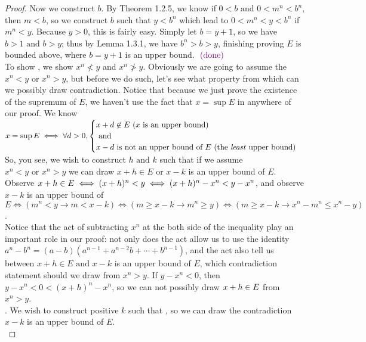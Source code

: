 \documentclass{report}
\begin{document}
\begin{proof}
Now we construct $b$. By Theorem 1.2.5, we know if $0<b\text{ and }0<m^n<b^n$, then $m<b$, so we construct $b$ such that $y<b^n$ which lead to $0<m^n<y<b^n$ if  $m^n<y$. Because $y>0$, this is fairly easy. Simply let $b=y+1$, so we have $b>1\text{ and }b>y$; thus by Lemma 1.3.1, we have $b^n>b>y$, finishing proving $E$ is bounded above, where  $b=y+1$ is an upper bound. $\textcolor{violet}{\text{ (done) }}$ \\

To show , we show $x^n\not<y$ and $x^n\not>y$. Obviously we are going to assume the $x^n<y$ or $x^n>y$, but before we do such, let's see what property from which can we possibly draw contradiction. Notice that because we just prove the existence of the supremum of $E$, we haven't use the fact that $x=\sup E$ in anywhere of our proof. We know $x=\sup E\iff \forall d>0,\begin{cases}
x+d\not\in E\text{ ($x$ is an upper bound) }\\
\text{ and }\\
x-d \text{ is not an upper bound of $E$ (the \emph{least} upper bound)}
\end{cases}$    
So, you see, we wish to construct $h\text{ and }k$ such that if we assume $x^n<y\text{ or }x^n>y$ we can draw $x+h\in E$ or $x-k$ is an upper bound of $E$.\\

Observe $x+h\in E\iff (x+h)^n<y\iff (x+h)^n-x^n<y-x^n$, and observe $x-k$ is an upper bound of $E\iff (m^n<y\longrightarrow m<x-k)\iff (m\geq x-k\longrightarrow m^n\geq y)\iff (m\geq x-k\longrightarrow x^n-m^n\leq x^n-y)$.\\

Notice that the act of  subtracting  $x^n$ at the both side of the inequality play an important role in our proof: not only does the act allow us to use the identity $a^n-b^n=(a-b)(a^{n-1}+a^{n-2}b+\cdots +b^{n-1})$, and the act also tell us between $x+h \in E\text{ and }x-k$ is an upper bound of $E$, which contradiction statement should we draw from $x^n>y$. If $y-x^n<0$, then  $y-x^n<0<(x+h)^n-x^n$, so we can not possibly draw $x+h\in E$ from $x^n>y$. \\

. We wish to construct positive $k$ such that , so we can draw the contradiction $x-k$ is an upper bound of $E$. \\ 


\end{proof}
\end{document}
